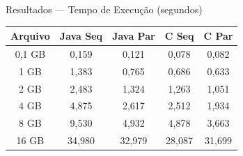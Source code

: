 \documentclass{beamer}
\begin{document}
\begin{frame}{Resultados — Tempo de Execução (segundos)}

\centering
\footnotesize
\begin{tabular}{ccccc}
\hline
\textbf{Arquivo} & \textbf{Java Seq} & \textbf{Java Par} & \textbf{C Seq} & \textbf{C Par} \\
\hline
0,1 GB  & 0,159  & 0,121  & 0,078 & 0,082 \\
1 GB    & 1,383  & 0,765  & 0,686 & 0,633 \\
2 GB    & 2,483  & 1,324  & 1,263 & 1,051 \\
4 GB    & 4,875  & 2,617  & 2,512 & 1,934 \\
8 GB    & 9,530  & 4,932  & 4,878 & 3,663 \\
16 GB   & 34,980 & 32,979 & 28,087 & 31,699 \\
\hline
\end{tabular}

\vspace{0.4cm}

\end{frame}
\end{document}
